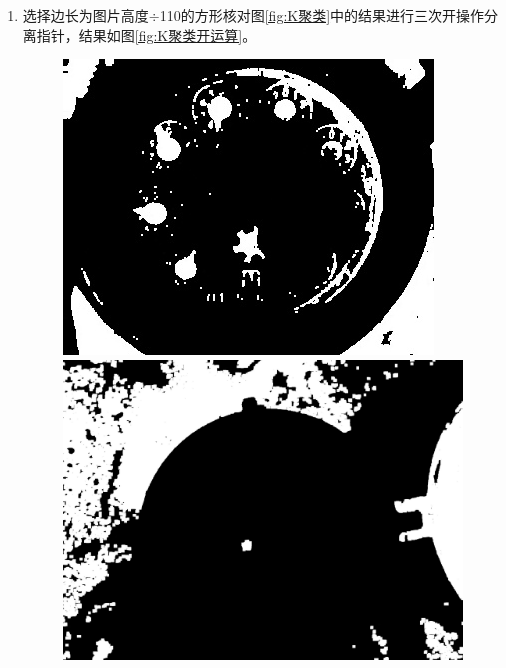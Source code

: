 \documentclass[a4paper]{ctexart}
\begin{document}
\begin{enumerate}[label=\arabic*、]
\begin{enumerate}[label=\alph*)]
		\item 选择边长为图片高度$\div$110的方形核对图\ref{fig:K聚类}中的结果进行三次开操作分离指针，结果如图\ref{fig:K聚类开运算}。
		\begin{figure}[htbp]
			\centering
			\begin{minipage}[t]{0.25\textwidth}
				\centering
				\includegraphics[width=\textwidth]{figure/open_2/img1.jpg}
			\end{minipage}
			\begin{minipage}[t]{0.25\textwidth}
				\centering
				\includegraphics[width=\textwidth]{figure/open_2/img2.jpg}
			\end{minipage}\\

\end{figure}
\end{enumerate}
\end{enumerate}
\end{document}
